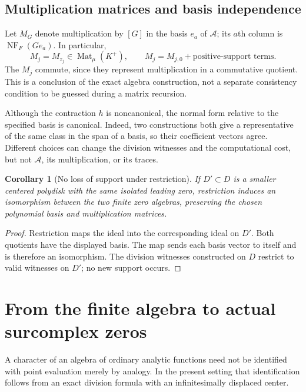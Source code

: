 \documentclass[11pt,letterpaper]{article}
\newtheorem{corollary}[theorem]{Corollary}
\theoremstyle{definition}
\theoremstyle{remark}
\newcommand{\NF}{\operatorname{NF}}
\newcommand{\Kp}{K^{+}}
\begin{document}
\subsection{Multiplication matrices and basis independence}
Let $M_G$ denote multiplication by $[G]$ in the basis $e_a$ of $\mathcal A$; its $a$th column is $\NF_F(Ge_a)$. In particular,
\begin{equation}\label{eq:matrices}
 M_j=M_{z_j}\in\operatorname{Mat}_\mu(\Kp),\qquad
 M_j=M_{j,0}+\text{positive-support terms}.
\end{equation}
The $M_j$ commute, since they represent multiplication in a commutative quotient. This is a conclusion of the exact algebra construction, not a separate consistency condition to be guessed during a matrix recursion.

Although the contraction $h$ is noncanonical, the normal form relative to the specified basis is canonical. Indeed, two constructions both give a representative of the same class in the span of a basis, so their coefficient vectors agree. Different choices can change the division witnesses and the computational cost, but not $\mathcal A$, its multiplication, or its traces.

\begin{corollary}[No loss of support under restriction]\label{cor:restriction}
If $D'\subset D$ is a smaller centered polydisk with the same isolated leading zero, restriction induces an isomorphism between the two finite zero algebras, preserving the chosen polynomial basis and multiplication matrices.
\end{corollary}
\begin{proof}
Restriction maps the ideal into the corresponding ideal on $D'$. Both quotients have the displayed basis. The map sends each basis vector to itself and is therefore an isomorphism. The division witnesses constructed on $D$ restrict to valid witnesses on $D'$; no new support occurs.
\end{proof}

\section{From the finite algebra to actual surcomplex zeros}
\label{sec:points}

A character of an algebra of ordinary analytic functions need not be identified with point evaluation merely by analogy. In the present setting that identification follows from an exact division formula with an infinitesimally displaced center.
\end{document}
